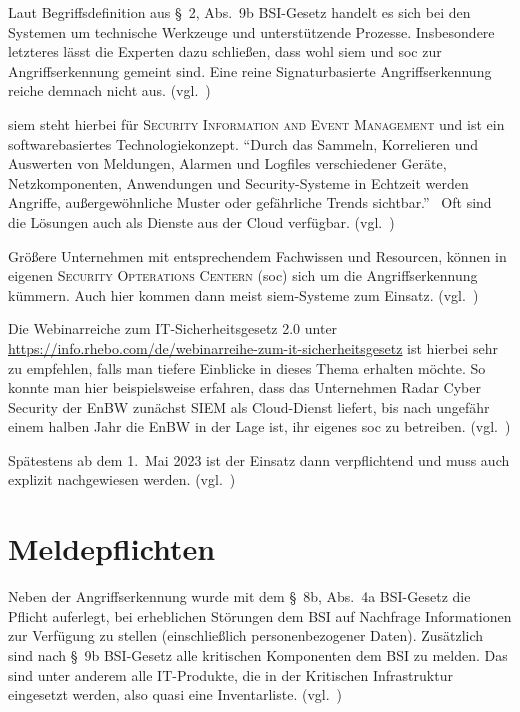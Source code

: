 Laut Begriffsdefinition aus §~2, Abs.~9b BSI-Gesetz handelt es sich bei den Systemen um technische Werkzeuge
und unterstützende Prozesse.
Insbesondere letzteres lässt die Experten dazu schließen, dass wohl \acrshort{siem} und \acrshort{soc} zur Angriffserkennung gemeint sind.
Eine reine Signaturbasierte Angriffserkennung reiche demnach nicht aus.
(vgl.~\cite{neue-it-sig-2.0})

\acrshort{siem} steht hierbei für \textsc{Security Information and Event Management} und ist ein softwarebasiertes Technologiekonzept.
\enquote{Durch das Sammeln, Korrelieren und Auswerten von Meldungen, Alarmen und Logfiles verschiedener Geräte,
Netzkomponenten, Anwendungen und Security-Systeme in Echtzeit werden Angriffe, außergewöhnliche Muster
oder gefährliche Trends sichtbar.}~\cite{siem}
Oft sind die Lösungen auch als Dienste aus der Cloud verfügbar.
(vgl.~\cite{siem})

Größere Unternehmen mit entsprechendem Fachwissen und Resourcen,
können in eigenen \textsc{Security Opterations Centern} (\acrshort{soc}) sich um die Angriffserkennung kümmern.
Auch hier kommen dann meist \acrshort{siem}-Systeme zum Einsatz.
(vgl.~\cite{soc})

Die Webinarreiche zum IT-Sicherheitsgesetz 2.0 unter \url{https://info.rhebo.com/de/webinarreihe-zum-it-sicherheitsgesetz}
ist hierbei sehr zu empfehlen, falls man tiefere Einblicke in dieses Thema erhalten möchte.
So konnte man hier beispielsweise erfahren, dass das Unternehmen Radar Cyber Security der EnBW zunächst SIEM als Cloud-Dienst liefert,
bis nach ungefähr einem halben Jahr die EnBW in der Lage ist, ihr eigenes \acrshort{soc} zu betreiben.
(vgl.~\cite{webinarreihe-it-sig-2.0-auftakt})

Spätestens ab dem 1.\ Mai 2023 ist der Einsatz dann verpflichtend und muss auch explizit nachgewiesen werden.
(vgl.~\cite{neue-it-sig-2.0})

\section{Meldepflichten}\label{sec:meldepflichten}
Neben der Angriffserkennung wurde mit dem §~8b, Abs.~4a BSI-Gesetz die Pflicht auferlegt,
bei erheblichen Störungen dem BSI auf Nachfrage Informationen zur Verfügung zu stellen (einschließlich personenbezogener Daten).
Zusätzlich sind nach §~9b BSI-Gesetz alle kritischen Komponenten dem BSI zu melden.
Das sind unter anderem alle IT-Produkte, die in der Kritischen Infrastruktur eingesetzt werden, also quasi eine Inventarliste.
(vgl.~\cite{neue-it-sig-2.0})

